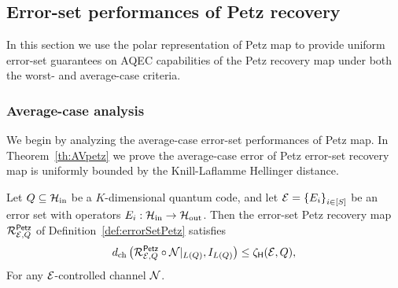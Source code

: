 \documentclass[10pt]{article}
\newcommand{\SIN}{\mathrm{in}}
\newcommand{\SOUT}{\mathrm{out}}
\newcommand{\p}[1]{\left(#1\right)}
\newcommand{\ppp}[1]{\left\{#1\right\}}
\newcommand{\s}[1]{\mathsf{#1}}
\begin{document}
\subsection{Error-set performances of Petz recovery}
In this section we use the polar representation of Petz map to provide uniform error-set guarantees on AQEC capabilities of the Petz recovery map under both the worst- and average-case criteria. 
 \subsubsection*{Average-case analysis}
 We begin by analyzing the average-case error-set performances of Petz map. In Theorem~\ref{th:AVpetz} we prove the average-case error of Petz error-set recovery map is uniformly bounded by the Knill-Laflamme Hellinger distance. 
 \begin{theorem}\label{th:AVpetz}
     Let $Q\subseteq\calH_{\SIN}$ be a $K$-dimensional quantum code, and let $\calE=\ppp{E_i}_{i\in[S]}$ be an error set with operators $E_i:\calH_{\SIN}\to\calH_{\SOUT}$. Then the error-set Petz recovery map $\calR_{\calE,Q}^{\s{Petz}}$ of Definition~\ref{def:errorSetPetz} satisfies 
     \[d_{\mathrm{ch}}\p{\calR_{\calE,Q}^{\s{\s{Petz}}}\circ \calN|_{L(Q)},I_{L(Q)}}\leq \zeta_{\s{H}}(\calE,Q),\]
    For any ${\cal E}$-controlled channel ${\cal N}$.
 \end{theorem}
  
\end{document}
